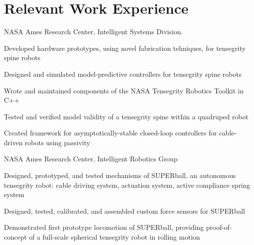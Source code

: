 \documentclass[letterpaper]{deedy-resume} %
\begin{document}
\vspace{0.4cm}


\section{Relevant Work Experience}

\vspace{0.2cm}


{{} NASA Ames Research Center, Intelligent Systems Division.

\begin{tightitemize}
\item Developed hardware prototypes, using novel fabrication tehniques, for tensegrity spine robots
\item Designed and simulated model-predictive controllers for tensegrity spine robots
\item Wrote and maintained components of the NASA Tensegrity Robotics Toolkit in C++
\item Tested and verified model validity of a tensegrity spine within a quadruped robot
\item Created framework for asymptotically-stable closed-loop controllers for cable-driven robots using passivity
\end{tightitemize}}

\newpage


{{} NASA Ames Research Center, Intelligent Robotics Group
  
\begin{tightitemize}
\item Designed, prototyped, and tested mechanisms of SUPERball, an autonomous tensegrity robot: cable driving system, actuation system, active compliance spring system
\item Designed, tested, calibrated, and assembled custom force sensors for SUPERball
\item Demonstrated first prototype locomotion of SUPERball, providing proof-of-concept of a full-scale spherical tensegrity robot in rolling motion
\end{tightitemize}}
\end{document}
